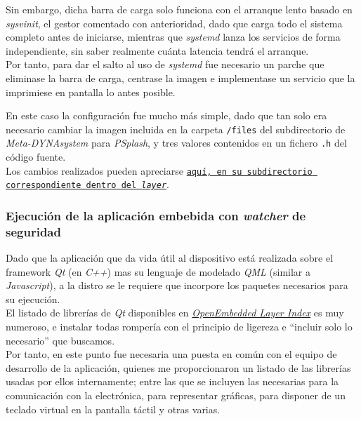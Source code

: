 Sin embargo, dicha barra de carga solo funciona con el arranque lento basado en \textit{sysvinit}, el gestor comentado con anterioridad, dado que carga todo el sistema completo antes de iniciarse, mientras que \textit{systemd} lanza los servicios de forma independiente, sin saber realmente cuánta latencia tendrá el arranque.\\

Por tanto, para dar el salto al uso de \textit{systemd} fue necesario un parche que eliminase la barra de carga, centrase la imagen e implementase un servicio que la imprimiese en pantalla lo antes posible.

En este caso la configuración fue mucho más simple, dado que tan solo era necesario cambiar la imagen incluida en la carpeta \texttt{/files} del subdirectorio de \textit{Meta-DYNAsystem} para \textit{PSplash}, y tres valores contenidos en un fichero \texttt{.h} del código fuente.\\

Los cambios realizados pueden apreciarse \href{https://github.com/adrianmorente/meta-dynasystem/tree/master/recipes-core/psplash}{\texttt{aquí, en su subdirectorio correspondiente dentro del \textit{layer}}}.

\subsubsection{Ejecución de la aplicación embebida con \textit{watcher} de seguridad}

Dado que la aplicación que da vida útil al dispositivo está realizada sobre el framework \textit{Qt} (en \textit{C++}) mas su lenguaje de modelado \textit{QML} (similar a \textit{Javascript}), a la distro se le requiere que incorpore los paquetes necesarios para su ejecución.\\

El listado de librerías de \textit{Qt} disponibles en \href{https://layers.openembedded.org}{\textit{OpenEmbedded Layer Index}} es muy numeroso, e instalar todas rompería con el principio de ligereza e ``incluir solo lo necesario'' que buscamos.\\

Por tanto, en este punto fue necesaria una puesta en común con el equipo de desarrollo de la aplicación, quienes me proporcionaron un listado de las librerías usadas por ellos internamente; entre las que se incluyen las necesarias para la comunicación con la electrónica, para representar gráficas, para disponer de un teclado virtual en la pantalla táctil y otras varias.\\

